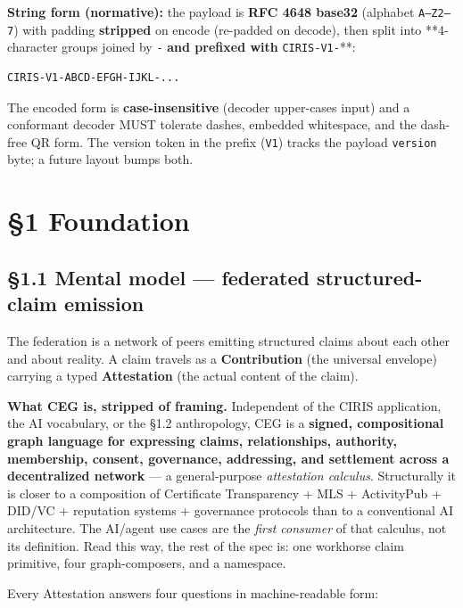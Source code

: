 \documentclass[11pt]{article}
\begin{document}
\textbf{String form (normative):} the payload is \textbf{RFC 4648 base32} (alphabet \texttt{A–Z2–7}) with padding \textbf{stripped} on encode (re-padded on decode), then split into **4-character groups joined by \texttt{-}\textbf{ and prefixed with }\texttt{CIRIS-V1-}**:


\begin{lstlisting}
CIRIS-V1-ABCD-EFGH-IJKL-...
\end{lstlisting}

The encoded form is \textbf{case-insensitive} (decoder upper-cases input) and a conformant decoder MUST tolerate dashes, embedded whitespace, and the dash-free QR form. The version token in the prefix (\texttt{V1}) tracks the payload \texttt{version} byte; a future layout bumps both.




\clearpage


\section*{§1 Foundation}


\subsection*{§1.1 Mental model — federated structured-claim emission}


The federation is a network of peers emitting structured claims about each other and about reality. A claim travels as a \textbf{Contribution} (the universal envelope) carrying a typed \textbf{Attestation} (the actual content of the claim).


\textbf{What CEG is, stripped of framing.} Independent of the CIRIS application, the AI vocabulary, or the §1.2 anthropology, CEG is a \textbf{signed, compositional graph language for expressing claims, relationships, authority, membership, consent, governance, addressing, and settlement across a decentralized network} — a general-purpose \textit{attestation calculus}. Structurally it is closer to a composition of Certificate Transparency + MLS + ActivityPub + DID/VC + reputation systems + governance protocols than to a conventional AI architecture. The AI/agent use cases are the \textit{first consumer} of that calculus, not its definition. Read this way, the rest of the spec is: one workhorse claim primitive, four graph-composers, and a namespace.


Every Attestation answers four questions in machine-readable form:
\end{document}
